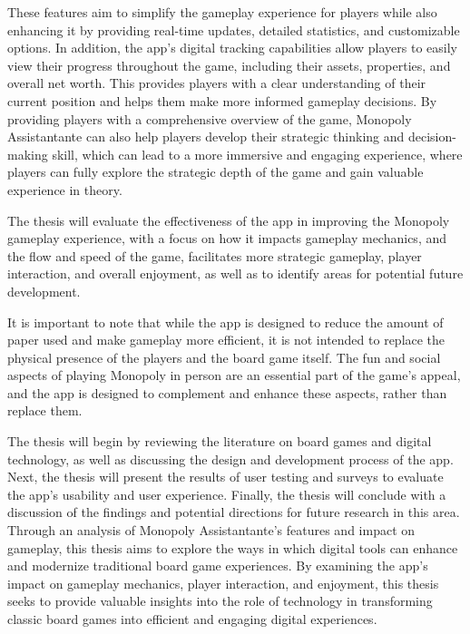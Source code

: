 \documentclass{article}
\begin{document}
        These features aim to simplify the gameplay experience for players while also enhancing it by providing real-time updates, detailed statistics, and customizable options. 
        In addition, the app's digital tracking capabilities allow players to easily view their progress throughout the game, including their assets, properties, and overall net worth. This provides players with a clear understanding of their current position and helps them make more informed gameplay decisions. By providing players with a comprehensive overview of the game, Monopoly Assistantante can also help players develop their strategic thinking and decision-making skill, which can lead to a more immersive and engaging experience, where players can fully explore the strategic depth of the game and gain valuable experience in theory.  

	The thesis will evaluate the effectiveness of the app in improving the Monopoly gameplay experience, with a focus on how it impacts gameplay mechanics, and the flow and speed of the game, facilitates more strategic gameplay, player interaction, and overall enjoyment, as well as to identify areas for potential future development.

        It is important to note that while the app is designed to reduce the amount of paper used and make gameplay more efficient, it is not intended to replace the physical presence of the players and the board game itself. The fun and social aspects of playing Monopoly in person are an essential part of the game's appeal, and the app is designed to complement and enhance these aspects, rather than replace them.

        The thesis will begin by reviewing the literature on board games and digital technology, as well as discussing the design and development process of the app. Next, the thesis will present the results of user testing and surveys to evaluate the app's usability and user experience. Finally, the thesis will conclude with a discussion of the findings and potential directions for future research in this area.
        Through an analysis of Monopoly Assistantante's features and impact on gameplay, this thesis aims to explore the ways in which digital tools can enhance and modernize traditional board game experiences. By examining the app's impact on gameplay mechanics, player interaction, and enjoyment, this thesis seeks to provide valuable insights into the role of technology in transforming classic board games into efficient and engaging digital experiences.
\end{document}

